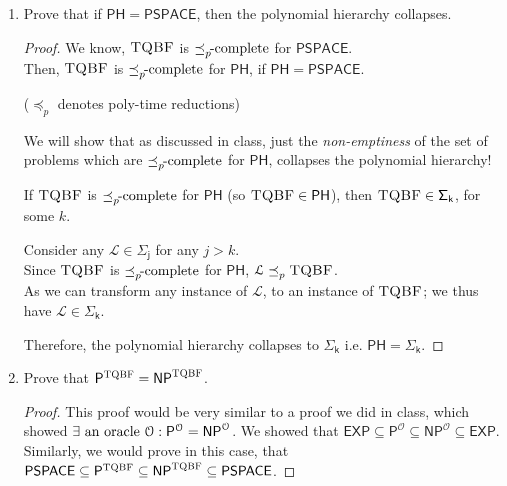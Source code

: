 \documentclass[usletter]{article}
\newcommand {\langset}[1]      {\ensuremath{\mathcal{#1}}}
\newcommand {\namedlangset}[1] {\ensuremath{\textnormal{\textsc{#1}}}}
\newcommand {\family}[1]       {\ensuremath{\mathsf{#1}}}
\newcommand {\reduce}[2]    {\ensuremath{\preceq_{#1}^{#2}}}
\newcommand {\complete}[2]  {\ensuremath{\reduce{#1}{#2}     %
                                         \hspace*{-4pt}\textnormal{-complete}}}
\newcommand{\ie}{\textnormal{i.e. }}
\newcommand {\langL}          {\langset{L}}
\begin{document}
\begin{enumerate}[labelsep=2.5em, label=\textbf{\arabic{enumi}}]
  \item Prove that if $\family{PH} = \family{PSPACE}$,
        then the polynomial hierarchy collapses.
  \begin{proof}
    We know, \namedlangset{TQBF} is \complete{p}{} for \family{PSPACE}. \\
    Then, \namedlangset{TQBF} is \complete{p}{} for \family{PH},
    if $\family{PH} = \family{PSPACE}$.

    (\reduce{p}{} denotes poly-time reductions)

    We will show that as discussed in class, just the \textit{non-emptiness} of
    the set of problems which are \complete{p}{} for \family{PH}, collapses the
    polynomial hierarchy!

    If \namedlangset{TQBF} is \complete{p}{} for \family{PH}
    (so $\namedlangset{TQBF} \in \family{PH}$),
    then $\namedlangset{TQBF} \in \family{\Sigma_k}$, for some $k$.

    Consider any $\langL \in \family{\Sigma_j}$ for any $j > k$. \\
    Since \namedlangset{TQBF} is \complete{p}{} for \family{PH},
    $\langL \reduce{p}{} \namedlangset{TQBF}$. \\
    As we can transform any instance of \langL,
    to an instance of \namedlangset{TQBF};
    we thus have $\langL \in \family{\Sigma_k}$.

    Therefore, the polynomial hierarchy collapses to $\family{\Sigma_k}$
    \ie $\family{PH} = \family{\Sigma_k}$.
  \end{proof}

  \item Prove that
        $\family{P}^\namedlangset{TQBF} = \family{NP}^\namedlangset{TQBF}$.
  \begin{proof}
    This proof would be very similar to a proof we did in class, which showed
    $\exists \textnormal{ an oracle } \langset{O}:
      \family{P}^\langset{O} = \family{NP}^\langset{O}$.
    We showed that $\family{EXP} \subseteq \family{P}^\langset{O}
                                 \subseteq \family{NP}^\langset{O}
                                 \subseteq \family{EXP}$.
    Similarly, we would prove in this case, that
    $\family{PSPACE} \subseteq \family{P}^\namedlangset{TQBF}
                     \subseteq \family{NP}^\namedlangset{TQBF}
                     \subseteq \family{PSPACE}$.


\end{proof}
\end{enumerate}
\end{document}
